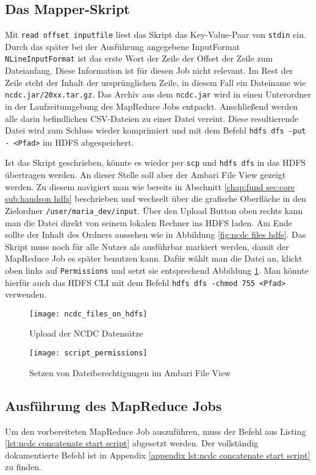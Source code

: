 \subsection{Das Mapper-Skript}
Mit \verb|read offset inputfile| liest das Skript das Key-Value-Paar von \verb|stdin| ein. Durch das später bei der Ausführung angegebene InputFormat \verb|NLineInputFormat| ist das erste Wort der Zeile der Offset der Zeile zum Dateianfang. Diese Information ist für diesen Job nicht relevant. Im Rest der Zeile steht der Inhalt der ursprünglichen Zeile, in diesem Fall ein Dateiname wie \verb|ncdc.jar/20xx.tar.gz|. 
Das Archiv aus dem \verb|ncdc.jar| wird in einen Unterordner in der Laufzeitumgebung des MapReduce Jobs entpackt. Anschließend werden alle darin befindlichen CSV-Dateien zu einer Datei vereint. Diese resultierende Datei wird zum Schluss wieder komprimiert und mit dem Befehl \verb|hdfs dfs -put - <Pfad>| im HDFS abgespeichert. 
\par
Ist das Skript geschrieben, könnte es wieder per \verb|scp| und \verb|hdfs dfs| in das HDFS übertragen werden. An dieser Stelle soll aber der Ambari File View gezeigt werden. Zu diesem navigiert man wie bereits in Abschnitt \ref{chap:fund sec:core sub:handson hdfs} beschrieben und wechselt über die grafische Oberfläche in den Zielordner \verb|/user/maria_dev/input|. Über den Upload Button oben rechts kann man die Datei direkt von seinem lokalen Rechner ins HDFS laden. Am Ende sollte der Inhalt des Ordners aussehen wie in Abbildung \ref{fig:ncdc files hdfs}. Das Skript muss noch für alle Nutzer als ausführbar markiert werden, damit der MapReduce Job es später benutzen kann. Dafür wählt man die Datei an, klickt oben links auf \verb|Permissions| und setzt sie entsprechend Abbildung \ref{fig:concat script permissions}. Man könnte hierfür auch das HDFS CLI mit dem Befehl \verb|hdfs dfs -chmod 755 <Pfad>| verwenden.

\begin{figure}[ht]
    \centering
    \texttt{[image: ncdc\_files\_on\_hdfs]}
    \caption[Upload der NCDC Datensätze]{Upload der NCDC Datensätze}
    \label{fig:ncdc files hdfs}
    \texttt{[image: script\_permissions]}
    \caption[Setzen von Dateiberechtigungen im Ambari File View]{Setzen von Dateiberechtigungen im Ambari File View}
    \label{fig:concat script permissions}
\end{figure}

\subsection{Ausführung des MapReduce Jobs}
Um den vorbereiteten MapReduce Job auszuführen, muss der Befehl aus Listing \ref{lst:ncdc concatenate start script} abgesetzt werden. Der vollständig dokumentierte Befehl ist in Appendix \ref{appendix lst:ncdc concatenate start script} zu finden. 

